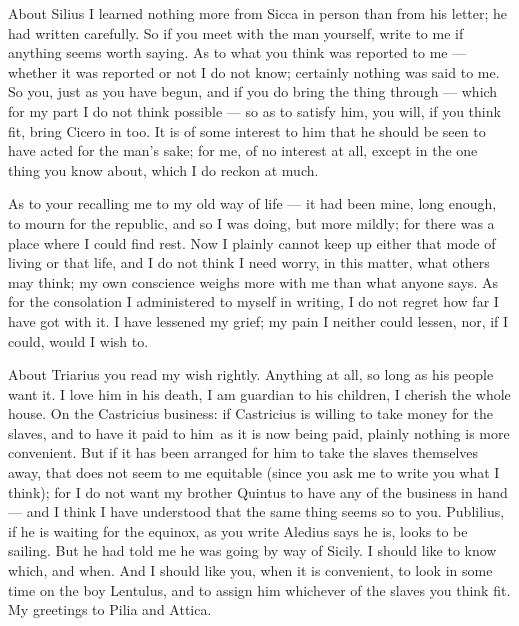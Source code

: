 

 About Silius I learned nothing more from Sicca in person than from his letter; he had written carefully. So if you meet with the man yourself, write to me if anything seems worth saying. As to what you think was reported to me --- whether it was reported or not I do not know; certainly nothing was said to me. So you, just as you have begun, and if you do bring the thing through --- which for my part I do not think possible --- so as to satisfy him, you will, if you think fit, bring Cicero in too. It is of some interest to him that he should be seen to have acted for the man's sake; for me, of no interest at all, except in the one thing you know about, which I do reckon at much.

 As to your recalling me to my old way of life --- it had been mine, long enough, to mourn for the republic, and so I was doing, but more mildly; for there was a place where I could find rest. Now I plainly cannot keep up either that mode of living or that life, and I do not think I need worry, in this matter, what others may think; my own conscience weighs more with me than what anyone says. As for the consolation I administered to myself in writing, I do not regret how far I have got with it. I have lessened my grief; my pain I neither could lessen, nor, if I could, would I wish to.

 About Triarius you read my wish rightly. Anything at all, so long as his people want it. I love him in his death, I am guardian to his children, I cherish the whole house. On the Castricius business: if Castricius is willing to take money for the slaves, and to have it paid \dag to him\dag\ as it is now being paid, plainly nothing is more convenient. But if it has been arranged for him to take the slaves themselves away, that does not seem to me equitable (since you ask me to write you what I think); for I do not want my brother Quintus to have any of the business in hand --- and I think I have understood that the same thing seems so to you. Publilius, if he is waiting for the equinox, as you write Aledius says he is, looks to be sailing. But he had told me he was going by way of Sicily. I should like to know which, and when. And I should like you, when it is convenient, to look in some time on the boy Lentulus, and to assign him whichever of the slaves you think fit. My greetings to Pilia and Attica.
